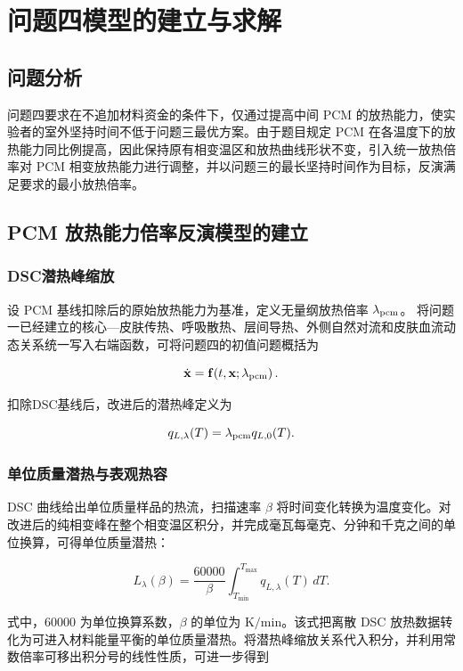 \documentclass[withoutpreface,bwprint]{cumcmthesis}
\begin{document}
\section{问题四模型的建立与求解}
\subsection{问题分析}
问题四要求在不追加材料资金的条件下，仅通过提高中间 PCM 的放热能力，使实验者的室外坚持时间不低于问题三最优方案。由于题目规定 PCM 在各温度下的放热能力同比例提高，因此保持原有相变温区和放热曲线形状不变，引入统一放热倍率对 PCM 相变放热能力进行调整，并以问题三的最长坚持时间作为目标，反演满足要求的最小放热倍率。

\subsection{PCM 放热能力倍率反演模型的建立}
\subsubsection{DSC潜热峰缩放}
设 PCM 基线扣除后的原始放热能力为基准，定义无量纲放热倍率 $\lambda_{\rm pcm}$。
将问题一已经建立的核心—皮肤传热、呼吸散热、层间导热、外侧自然对流和皮肤血流动态关系统一写入右端函数，可将问题四的初值问题概括为

\begin{equation}
\dot{\mathbf x}=\mathbf f\!\left(t,\mathbf x;\lambda_{\rm pcm}\right).
\end{equation}

扣除DSC基线后，改进后的潜热峰定义为

\begin{equation}
q_{L,\lambda}(T)=\lambda_{\rm pcm}q_{L,0}(T).
\end{equation}


\subsubsection{单位质量潜热与表观热容}

DSC 曲线给出单位质量样品的热流，扫描速率 $\beta$ 将时间变化转换为温度变化。对改进后的纯相变峰在整个相变温区积分，并完成毫瓦每毫克、分钟和千克之间的单位换算，可得单位质量潜热：

$$
L_{\lambda}(\beta)=\frac{60000}{\beta}\int_{T_{\min}}^{T_{\max}}q_{L,\lambda}(T)\,dT.
$$

式中，$60000$ 为单位换算系数，$\beta$ 的单位为 $\mathrm{K/min}$。该式把离散 DSC 放热数据转化为可进入材料能量平衡的单位质量潜热。将潜热峰缩放关系代入积分，并利用常数倍率可移出积分号的线性性质，可进一步得到
\end{document}
